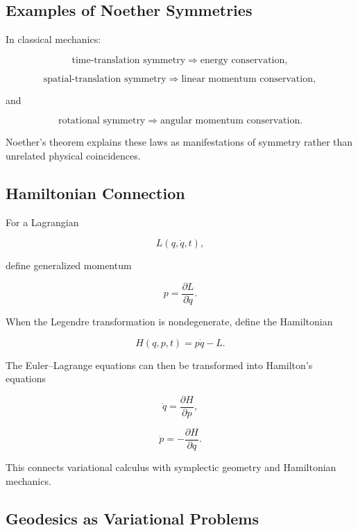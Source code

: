 \subsection{Examples of Noether Symmetries}
\label{subsec:noether-examples}

In classical mechanics:

\[
\boxed{
\text{time-translation symmetry}
\Longrightarrow
\text{energy conservation},
}
\]

\[
\boxed{
\text{spatial-translation symmetry}
\Longrightarrow
\text{linear momentum conservation},
}
\]

and

\[
\boxed{
\text{rotational symmetry}
\Longrightarrow
\text{angular momentum conservation}.
}
\]

Noether's theorem explains these laws as manifestations of symmetry
rather than unrelated physical coincidences.

\subsection{Hamiltonian Connection}
\label{subsec:variational-hamiltonian}

For a Lagrangian

\[
L(q,\dot q,t),
\]

define generalized momentum

\[
\boxed{
p
=
\frac{\partial L}{\partial\dot q}.
}
\]

When the Legendre transformation is nondegenerate, define the Hamiltonian

\[
\boxed{
H(q,p,t)
=
p\dot q-L.
}
\]

The Euler--Lagrange equations can then be transformed into Hamilton's
equations

\[
\boxed{
\dot q
=
\frac{\partial H}{\partial p},
}
\]

\[
\boxed{
\dot p
=
-\frac{\partial H}{\partial q}.
}
\]

This connects variational calculus with symplectic geometry and
Hamiltonian mechanics.

\subsection{Geodesics as Variational Problems}
\label{subsec:geodesics-variational}

